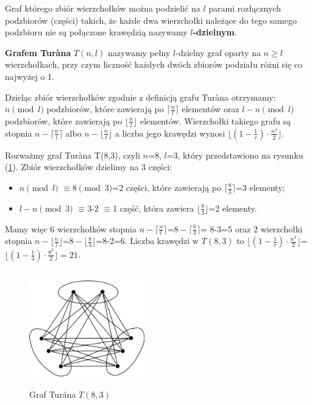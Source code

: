 \documentclass[miz,woman]{mgrwms}
\begin{document}
\begin{defi}
 Graf którego zbiór wierzchołków można podzielić na $l$ parami rozłącznych podzbiorów (części) takich, że każde dwa wierzchołki
należące do tego samego podzbioru nie są połączone krawędzią nazywamy \textbf{$l$-dzielnym}.
\end{defi}



\begin{defi}
 \textbf{Grafem Tur\`ana} $T(n,l)$ nazywamy pełny $l$-dzielny graf oparty na $n\geq l$ wierzchołkach, przy czym liczność każdych
dwóch zbiorów podziału różni się co najwyżej o 1. 
\end{defi}
Dzieląc zbiór wierzchołków zgodnie z definicją grafu  Tur\`ana otrzymamy: $n\pmod l$ podzbiorów, które zawierają po $\lceil \frac{n}{l} \rceil$
elementów oraz $l-n\pmod l$ podzbiorów, które zawierają po $\lfloor \frac{n}{l} \rfloor$ elementów. Wierzchołki takiego grafu są stopnia $n-\lceil \frac{n}{l} \rceil$
albo $n- \lfloor \frac{n}{l} \rfloor$ a liczba jego krawędzi wynosi $\lfloor(1-\frac{1}{r}) \cdot \frac{n^2}{2} \rfloor$.\\
\begin{przy}
Rozważmy graf Tur\`ana T(8,3), czyli $n$=8, $l$=3, który przedstawiono na rysunku (\ref{Turan}).
Zbiór wierzchołków dzielimy na 3 części:
\begin{itemize}
 \item $n\pmod l$  $\equiv $8$\pmod 3$=2 części, które zawierają po $\lceil \frac{8}{3} \rceil$=3 elementy;
 \item $l-n\pmod 3$ $\equiv $3-2 $\equiv $1 część, która zawiera $\lfloor \frac{8}{3} \rfloor$=2 elementy.
\end{itemize}
Mamy więc 6 wierzchołków stopnia $n-\lceil \frac{n}{l} \rceil$=$8-\lceil \frac{8}{3} \rceil $= 8-3=5 oraz 2 wierzchołki stopnia 
$n- \lfloor \frac{n}{l} \rfloor$=$8- \lfloor \frac{8}{3} \rfloor$=8-2=6.
Liczba krawędzi w $T(8,3)$ to $\lfloor(1-\frac{1}{r}) \cdot \frac{n^2}{2} \rfloor$=$\lfloor(1-\frac{1}{3}) \cdot 
\frac{8^2}{2} \rfloor=21$.
\begin{figure}[h]
\centering
\includegraphics[width=5cm, height=5cm]{Turan.png}
\caption{Graf Tur\'ana $T(8,3)$}
    \label{Turan}
\end{figure}
\end{przy}
\end{document}
